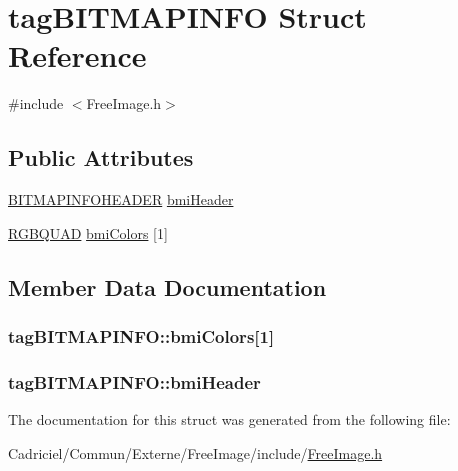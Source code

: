 \hypertarget{structtag_b_i_t_m_a_p_i_n_f_o}{\section{tag\-B\-I\-T\-M\-A\-P\-I\-N\-F\-O Struct Reference}
\label{structtag_b_i_t_m_a_p_i_n_f_o}
}


{\ttfamily \#include $<$Free\-Image.\-h$>$}

\subsection*{Public Attributes}
\begin{DoxyCompactItemize}
\item 
\hyperlink{_free_image_8h_a5334657d9ccd03e5f7681d8172c7b73c}{B\-I\-T\-M\-A\-P\-I\-N\-F\-O\-H\-E\-A\-D\-E\-R} \hyperlink{structtag_b_i_t_m_a_p_i_n_f_o_a1cbcd562dccbedec498b504f247405c3}{bmi\-Header}
\item 
\hyperlink{_free_image_8h_a2b5290bfab12743335a843900be5deeb}{R\-G\-B\-Q\-U\-A\-D} \hyperlink{structtag_b_i_t_m_a_p_i_n_f_o_a5a9747ecf91e36b60469f6483ec1980e}{bmi\-Colors} \mbox{[}1\mbox{]}
\end{DoxyCompactItemize}


\subsection{Member Data Documentation}
\hypertarget{structtag_b_i_t_m_a_p_i_n_f_o_a5a9747ecf91e36b60469f6483ec1980e}{
\subsubsection[{bmi\-Colors}]{ tag\-B\-I\-T\-M\-A\-P\-I\-N\-F\-O\-::bmi\-Colors\mbox{[}1\mbox{]}}}\label{structtag_b_i_t_m_a_p_i_n_f_o_a5a9747ecf91e36b60469f6483ec1980e}
\hypertarget{structtag_b_i_t_m_a_p_i_n_f_o_a1cbcd562dccbedec498b504f247405c3}{
\subsubsection[{bmi\-Header}]{ tag\-B\-I\-T\-M\-A\-P\-I\-N\-F\-O\-::bmi\-Header}}\label{structtag_b_i_t_m_a_p_i_n_f_o_a1cbcd562dccbedec498b504f247405c3}


The documentation for this struct was generated from the following file\-:\begin{DoxyCompactItemize}
\item 
Cadriciel/\-Commun/\-Externe/\-Free\-Image/include/\hyperlink{_free_image_8h}{Free\-Image.\-h}\end{DoxyCompactItemize}
